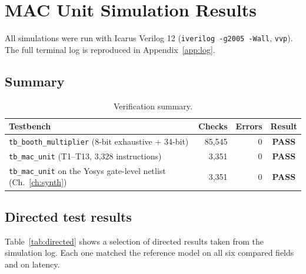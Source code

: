 \documentclass[11pt,a4paper]{report}
\newcommand{\code}[1]{\texttt{#1}}
\begin{document}
\chapter{MAC Unit Simulation Results}\label{ch:results}

All simulations were run with Icarus Verilog 12 (\code{iverilog -g2005 -Wall},
\code{vvp}). The full terminal log is reproduced in Appendix~\ref{app:log}.

\section{Summary}
\begin{table}[H]
  \centering
  \caption{Verification summary.}
  \label{tab:summary}
  \begin{tabular}{@{}lrrc@{}}
    \toprule
    Testbench & Checks & Errors & Result \\
    \midrule
    \code{tb\_booth\_multiplier} (8-bit exhaustive + 34-bit) & 85{,}545 & 0 & \textbf{PASS} \\
    \code{tb\_mac\_unit} (T1--T13, 3{,}328 instructions)      & 3{,}351  & 0 & \textbf{PASS} \\
    \code{tb\_mac\_unit} on the Yosys gate-level netlist (Ch.~\ref{ch:synth}) & 3{,}351 & 0 & \textbf{PASS} \\
    \bottomrule
  \end{tabular}
\end{table}

\section{Directed test results}
Table~\ref{tab:directed} shows a selection of directed results taken from the
simulation log. Each one matched the reference model on all six compared
fields and on latency.
\end{document}
